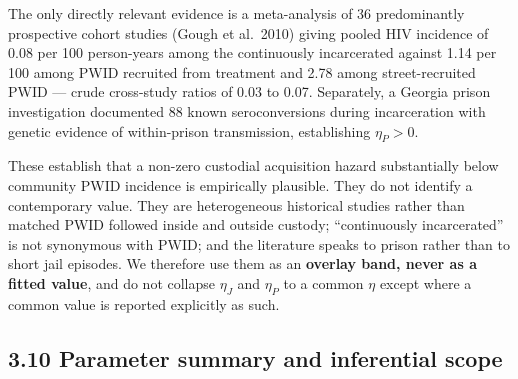 The only directly relevant evidence is a meta-analysis of 36 predominantly prospective cohort studies (Gough et al.~2010) giving pooled HIV incidence of 0.08 per 100 person-years among the continuously incarcerated against 1.14 per 100 among PWID recruited from treatment and 2.78 among street-recruited PWID --- crude cross-study ratios of 0.03 to 0.07. Separately, a Georgia prison investigation documented 88 known seroconversions during incarceration with genetic evidence of within-prison transmission, establishing \(\eta_P>0\).

These establish that a non-zero custodial acquisition hazard substantially below community PWID incidence is empirically plausible. They do not identify a contemporary value. They are heterogeneous historical studies rather than matched PWID followed inside and outside custody; ``continuously incarcerated'' is not synonymous with PWID; and the literature speaks to prison rather than to short jail episodes. We therefore use them as an \textbf{overlay band, never as a fitted value}, and do not collapse \(\eta_J\) and \(\eta_P\) to a common \(\eta\) except where a common value is reported explicitly as such.

\subsection{3.10 Parameter summary and inferential scope}

